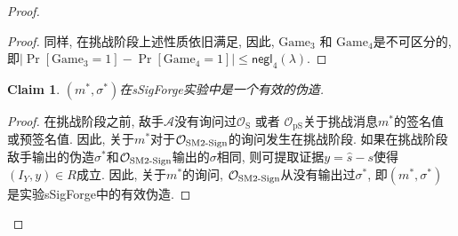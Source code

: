 \documentclass[review]{jcr}
\newtheorem{claim}{Claim}
\begin{document}
\begin{proof}
\begin{proof}
同样, 在挑战阶段上述性质依旧满足, 因此, $\text{Game}_3$ 和 $\text{Game}_4$是不可区分的, 即$|\Pr[\text{Game}_3 = 1] - \Pr[\text{Game}_4 = 1]|\leq\mathsf{negl}_4(\lambda).$
\end{proof}

\begin{claim}
$(m^*,\sigma^*)$在sSigForge实验中是一个有效的伪造. 
\end{claim}

\begin{proof}
在挑战阶段之前, 敌手$\mathcal{A}$没有询问过$\mathcal{O}_{\text{S}}$ 或者 $\mathcal{O}_{\text{pS}}$关于挑战消息$m^*$的签名值或预签名值. 因此, 关于$m^*$对于$\mathcal{O}_{\text{SM2\text{-}Sign}}$的询问发生在挑战阶段. 如果在挑战阶段敌手输出的伪造$\sigma^*$和$\mathcal{O}_{\text{SM2\text{-}Sign}}$输出的$\sigma$相同, 则可提取证据$y=\hat{s}-s$使得$(I_Y, y) \in R$成立. 因此, 关于$m^*$的询问, $\mathcal{O}_{\text{SM2\text{-}Sign}}$从没有输出过$\sigma^*$, 即$(m^*,\sigma^*)$ 是实验sSigForge中的有效伪造. 
\end{proof}

\begin{center}
\end{center}
\end{proof}
\end{document}
